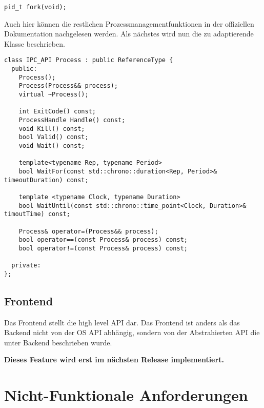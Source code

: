 \documentclass[a4paper]{book}
\begin{document}
\lstset{language=[GNU]C++}
\begin{lstlisting}[caption={fork},frame=single]
pid_t fork(void);
\end{lstlisting}

\noindent Auch hier können die restlichen Prozessmanagementfunktionen in der offiziellen Dokumentation nachgelesen werden. Als nächstes wird nun die zu adaptierende Klasse beschrieben.

\lstset{language=C++,breaklines=true}
\begin{lstlisting}[caption={class Process},frame=single]
class IPC_API Process : public ReferenceType {
  public:
    Process();
    Process(Process&& process);
    virtual ~Process();
    
    int ExitCode() const;
    ProcessHandle Handle() const;
    void Kill() const;
    bool Valid() const;
    void Wait() const;
    
    template<typename Rep, typename Period>
    bool WaitFor(const std::chrono::duration<Rep, Period>& timeoutDuration) const;
    
    template <typename Clock, typename Duration>
    bool WaitUntil(const std::chrono::time_point<Clock, Duration>& timoutTime) const;
    
    Process& operator=(Process&& process);
    bool operator==(const Process& process) const;
    bool operator!=(const Process& process) const;
    
  private:
};
\end{lstlisting}

\subsection{Frontend}
Das Frontend stellt die high level API dar. Das Frontend ist anders als das Backend nicht von der OS API abhängig, sondern von der Abstrahierten API die unter Backend beschrieben wurde.\newline

\noindent \textbf{Dieses Feature wird erst im nächsten Release implementiert.}

\section{Nicht-Funktionale Anforderungen}
\end{document}
